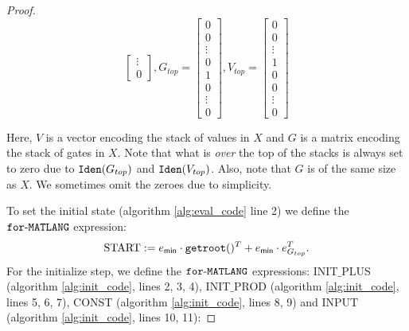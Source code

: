 \begin{proof}
\[\begin{bmatrix}
        \vdots \\
        0 
    \end{bmatrix}, 
    G_{top} = \begin{bmatrix}
        0  \\
        0 \\
        \vdots   \\
        0 \\
        1 \\
        0 \\
        \vdots \\
        0 
    \end{bmatrix}, 
    V_{top} = \begin{bmatrix}
        0  \\
        0 \\
        \vdots   \\
        1 \\
        0 \\
        0 \\
        \vdots \\
        0 
    \end{bmatrix}
    \]

    Here, $V$ is a vector encoding the stack of values in $X$ and $G$ is a matrix encoding the stack of gates in $X$.
    Note that what is \textit{over} the top of the stacks is always set to zero due to $\texttt{Iden}(G_{top})$ and $\texttt{Iden}(V_{top})$.
    Also, note that $G$ is of the same size as $X$. We sometimes omit the zeroes due to simplicity.

    To set the initial state (algorithm \ref{alg:eval_code} line 2) we define the $\texttt{for}\text{-}\texttt{MATLANG}$ expression: $$\text{START}:= e_{\mathsf{min}}\cdot \texttt{getroot}()^T + e_{\mathsf{min}}\cdot e_{G_{top}}^T.$$
    For the initialize step, we define the $\texttt{for}\text{-}\texttt{MATLANG}$ expressions: INIT${\_}$PLUS (algorithm \ref{alg:init_code}, lines 2, 3, 4), INIT${\_}$PROD (algorithm \ref{alg:init_code}, lines 5, 6, 7), CONST (algorithm \ref{alg:init_code}, lines 8, 9) and INPUT (algorithm \ref{alg:init_code}, lines 10, 11):


\end{proof}
